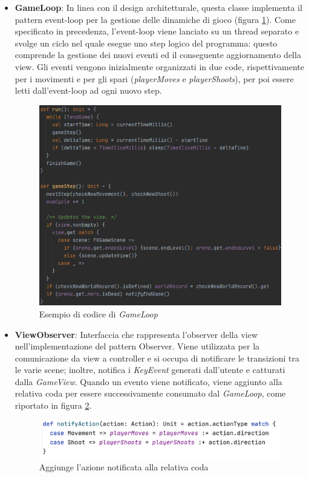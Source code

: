 \begin{itemize}
    \item \textbf{GameLoop}: In linea con il design architetturale, questa classe implementa il pattern event-loop per la gestione delle dinamiche di gioco (figura \ref{gameLoopCode}). Come specificato in precedenza, l'event-loop viene lanciato su un thread separato e svolge un ciclo nel quale esegue uno step logico del programma: questo comprende la gestione dei nuovi eventi ed il conseguente aggiornamento della view. Gli eventi vengono inizialmente organizzati in due code, rispettivamente per i movimenti e per gli spari (\textit{playerMoves} e \textit{playerShoots}), per poi essere letti dall'event-loop ad ogni nuovo step.
    
    \begin{figure}[H]
      \includegraphics[width=15cm]{res/gameLoopCode.png}
      \caption{Esempio di codice di \textit{GameLoop}}
      \label{gameLoopCode}
    \end{figure}

    \item \textbf{ViewObserver}: Interfaccia che rappresenta l'observer della view nell'implementazione del pattern Observer. Viene utilizzata per la comunicazione da view a controller e si occupa di notificare le transizioni tra le varie scene; inoltre, notifica i \textit{KeyEvent} generati dall'utente e catturati dalla \textit{GameView}. Quando un evento viene notificato, viene aggiunto alla relativa coda per essere successivamente consumato dal \textit{GameLoop}, come riportato in figura \ref{notifyAction}.
    
    \begin{figure}[H]
      \includegraphics[width=14cm]{res/notifyAction.png}
      \caption{Aggiunge l'azione notificata alla relativa coda}
      \label{notifyAction}
    \end{figure}
\end{itemize}